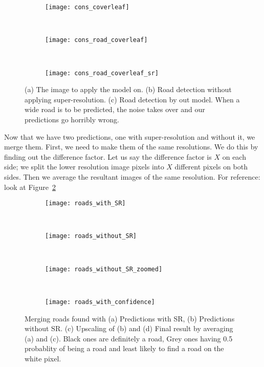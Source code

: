 \begin{figure}[h!]
  \centering
  \begin{subfigure}{0.3\textwidth}
    \texttt{[image: cons\_coverleaf]}
    \caption{}
  \end{subfigure}~
  \begin{subfigure}{0.3\textwidth}
    \texttt{[image: cons\_road\_coverleaf]}
    \caption{}
  \end{subfigure}~
  \begin{subfigure}{0.3\textwidth}
    \texttt{[image: cons\_road\_coverleaf\_sr]}
    \caption{}
  \end{subfigure}
  \caption[Problem in predictions large roads]{(a) The image to apply the model on. (b) Road detection without applying super-resolution. (c) Road detection by out model. When a wide road is to be predicted, the noise takes over and our predictions go horribly wrong.}
  \label{fig:cons_coverleaf}
\end{figure}


Now that we have two predictions, one with super-resolution and without it, we merge them. First, we need to make them of the same resolutions. We do this by finding out the difference factor. Let us say the difference factor is $X$ on each side; we split the lower resolution image pixels into $X$ different pixels on both sides. Then we average the resultant images of the same resolution. For reference: look at Figure~\ref{fig:roads_in_confidence}

\begin{figure}[h!]
  \begin{subfigure}[b]{0.25\textwidth}
    \texttt{[image: roads\_with\_SR]}
    \caption{}
  \end{subfigure}~
  \begin{subfigure}[b]{0.15\textwidth}
    \texttt{[image: roads\_without\_SR]}
    \caption{}
  \end{subfigure}~
  \begin{subfigure}[b]{0.25\textwidth}
    \texttt{[image: roads\_without\_SR\_zoomed]}
    \caption{}
  \end{subfigure}~
  \begin{subfigure}[b]{0.25\textwidth}
    \texttt{[image: roads\_with\_confidence]}
    \caption{}
  \end{subfigure}
  \caption[Finding likelihood of roads in predictions.]{Merging roads found with (a) Predictions with SR, (b) Predictions without SR. (c) Upscaling of (b) and (d) Final result by averaging (a) and (c). Black ones are definitely a road, Grey ones having 0.5 probablity of being a road and  least likely to find a road on the white pixel.}
  \label{fig:roads_in_confidence}
\end{figure}

